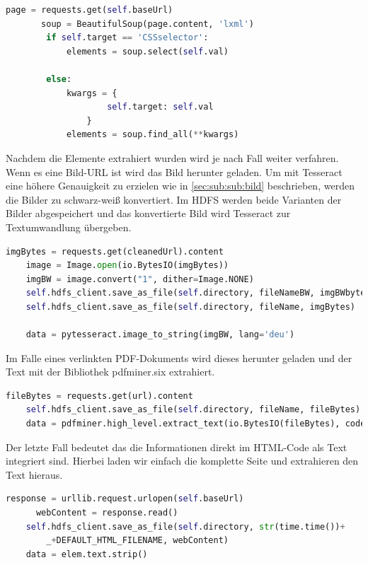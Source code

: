 \documentclass[12pt,oneside,a4paper,parskip]{scrbook}
\begin{document}
\begin{lstlisting}[caption=Parsen und filtern der Website, language=Python]
	page = requests.get(self.baseUrl)
       soup = BeautifulSoup(page.content, 'lxml')
        if self.target == 'CSSselector':
            elements = soup.select(self.val)

        else:
            kwargs = {
                    self.target: self.val
                }
            elements = soup.find_all(**kwargs)
\end{lstlisting}

Nachdem die Elemente extrahiert wurden wird je nach Fall weiter verfahren. Wenn es eine Bild-URL ist wird das Bild herunter geladen. Um mit Tesseract eine höhere Genauigkeit zu erzielen wie in \cref{sec:sub:sub:bild} beschrieben, werden die Bilder zu schwarz-weiß konvertiert. Im HDFS werden beide Varianten der Bilder abgespeichert und das konvertierte Bild wird Tesseract zur Textumwandlung übergeben.

\begin{lstlisting}[caption=Schwarz-weiß Konvertierung, language=Python]
	imgBytes = requests.get(cleanedUrl).content
	image = Image.open(io.BytesIO(imgBytes))
	imgBW = image.convert("1", dither=Image.NONE)
	self.hdfs_client.save_as_file(self.directory, fileNameBW, imgBWbytes)
	self.hdfs_client.save_as_file(self.directory, fileName, imgBytes)

	data = pytesseract.image_to_string(imgBW, lang='deu')
\end{lstlisting}

Im Falle eines verlinkten PDF-Dokuments wird dieses herunter geladen und der Text mit der Bibliothek pdfminer.six extrahiert.

\begin{lstlisting}[caption=PDF Text Extraktion, language=Python]
	fileBytes = requests.get(url).content
	self.hdfs_client.save_as_file(self.directory, fileName, fileBytes)
	data = pdfminer.high_level.extract_text(io.BytesIO(fileBytes), codec="utf-8")
\end{lstlisting}

Der letzte Fall bedeutet das die Informationen direkt im HTML-Code als Text integriert sind. Hierbei laden wir einfach die komplette Seite und extrahieren den Text hieraus.

\begin{lstlisting}[caption=Website speichern, language=Python]
	response = urllib.request.urlopen(self.baseUrl)
      webContent = response.read()
	self.hdfs_client.save_as_file(self.directory, str(time.time())+
		_+DEFAULT_HTML_FILENAME, webContent)
	data = elem.text.strip()
\end{lstlisting}
\end{document}
